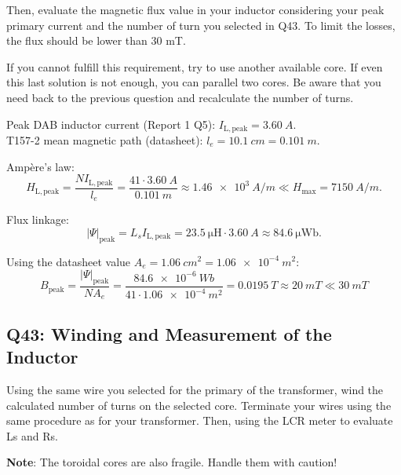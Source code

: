 \documentclass{PELsmallreport}
\begin{document}
Then, evaluate the magnetic flux value in your inductor considering your peak primary current and the number of turn you selected in Q43. 
To limit the losses, the flux should be lower than 30 mT. 

If you cannot fulfill this requirement, try to use another available core. 
If even this last solution is not enough, you can parallel two cores. 
Be aware that you need back to the previous question and recalculate the number of turns. 
\\

\begin{framed}
\vspace{2em}


Peak DAB inductor current (Report 1 Q5): 
$I_{\mathrm{L,peak}} = \SI{3.60}{A}$. \\
T157-2 mean magnetic path (datasheet): 
$l_e = \SI{10.1}{cm} = \SI{0.101}{m}$.

\vspace{1em}
Ampère's law:
\[
H_{\mathrm{L,peak}} = \frac{N I_{\mathrm{L,peak}}}{l_e}
= \frac{41 \cdot \SI{3.60}{A}}{\SI{0.101}{m}}
\approx \SI{1.46e3}{A/m}
\ll H_{\mathrm{max}} = \SI{7150}{A/m}.
\]

\vspace{1em}
Flux linkage:
\[
|\Psi|_{\mathrm{peak}} = L_s I_{\mathrm{L,peak}}
= \SI{23.5}{\micro\henry} \cdot \SI{3.60}{A}
\approx \SI{84.6}{\micro\weber}.
\]

Using the datasheet value $A_e = \SI{1.06}{cm^2} = \SI{1.06e-4}{m^2}$:
\[
B_{\mathrm{peak}} = \frac{|\Psi|_{\mathrm{peak}}}{N A_e}
= \frac{\SI{84.6e-6}{Wb}}{41 \cdot \SI{1.06e-4}{m^2}} =\SI{0.0195}{T}
\approx \SI{20}{mT} \ll \SI{30}{mT}
\]
\end{framed}
 \qquad
{} \hfill{}




\subsection{Q43: Winding and Measurement of the Inductor}
Using the same wire you selected for the primary of the transformer, wind the calculated number of turns on the selected core. 
Terminate your wires using the same procedure as for your transformer. 
Then, using the LCR meter to evaluate Ls and Rs. 

\textbf{Note}: The toroidal cores are also fragile. Handle them with caution!  
\end{document}

